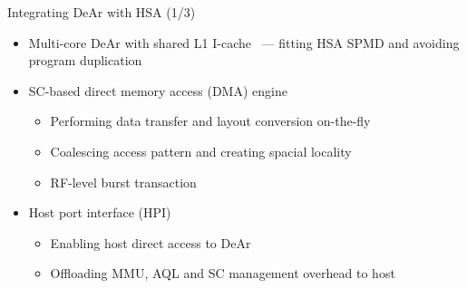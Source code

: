 \documentclass{beamer}
\begin{document}
\begin{CJK}{UTF8}{bkai}
            \begin{frame}{Integrating DeAr with HSA (1/3)}
                \begin{itemize}
                    \item <2-> {Multi-core DeAr with shared L1 I-cache~ --- fitting HSA SPMD and avoiding program duplication}
                    \item <3-> {SC-based direct memory access (DMA) engine~
                            \begin{itemize}
                                \item Performing data transfer and layout conversion on-the-fly
                                \item Coalescing access pattern and creating spacial locality
                                \item RF-level burst transaction
                            \end{itemize}
                        }
                    \item <4-> {Host port interface (HPI)~
                            \begin{itemize}
                                \item Enabling host direct access to DeAr
                                \item Offloading MMU, AQL and SC management overhead to host
                            \end{itemize}
                        }
                \end{itemize}
            \end{frame}


\end{CJK}
\end{document}
